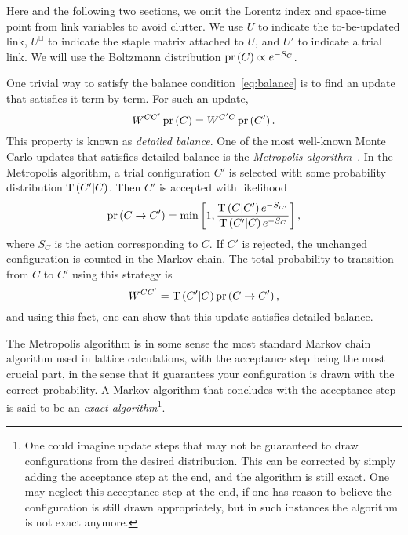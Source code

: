 Here and the following two sections,
we omit the Lorentz index and space-time point from link variables to
avoid clutter.  We use $U$ to indicate the to-be-updated link, 
$U^\sqcup$ to indicate the staple matrix attached to $U$, and
$U'$ to indicate a trial link. We will use the Boltzmann
distribution $\operatorname{pr}\left(C\right)\propto e^{-S_C}$.

One trivial way to satisfy the balance condition~\eqref{eq:balance} is
to find an update that satisfies it term-by-term. For such an update, 
\begin{equation}\label{eq:detailedbalance}\index{detailed balance}
    W^{CC'}\pr{C}=W^{C'C}\pr{C'}.
\end{equation}
This property is known as {\it detailed balance}.
One of the most well-known Monte Carlo updates that satisfies detailed
balance is the {\it Metropolis algorithm}~\cite{metropolis_equation_1953}. 
In the Metropolis algorithm, a trial configuration $C'$ is selected 
with some probability distribution $\operatorname{T}\left(C'|C\right)$. Then $C'$
is accepted with likelihood
\begin{equation}\label{eq:metupdate}
  \operatorname{pr}\left(C\to C'\right)=\min\left[1,\frac{\operatorname{T}\left(C|C'\right)e^{-S_{C'}}}
    {\operatorname{T}\left(C'|C\right)e^{-S_C}}\right],
\end{equation}
where $S_C$ is the action corresponding to $C$. 
If $C'$ is rejected, the unchanged configuration is counted
in the Markov chain. The total probability
to transition from $C$ to $C'$ using this strategy is 
\begin{equation}\label{eq:MCMCtransition}
W^{CC'}=\operatorname{T}\left(C'|C\right)\operatorname{pr}\left(C\to C'\right), 
\end{equation}
and using this fact, one
can show that this update satisfies detailed balance.

The Metropolis algorithm is in some sense the most standard Markov chain
algorithm used in lattice calculations, with the acceptance step
 being the most crucial part, in the sense that
it guarantees your configuration is drawn with the correct probability.
A Markov algorithm that concludes with the acceptance step is
said to be an {\it exact algorithm}\footnote{One
could imagine update steps that may not be guaranteed to draw configurations
from the desired distribution. This can be corrected by simply adding
the acceptance step at the end, and the algorithm is still exact.
One may neglect this acceptance step at the end, if one has reason to
believe the configuration is still drawn appropriately, but in such
instances the algorithm is not exact anymore.}.

